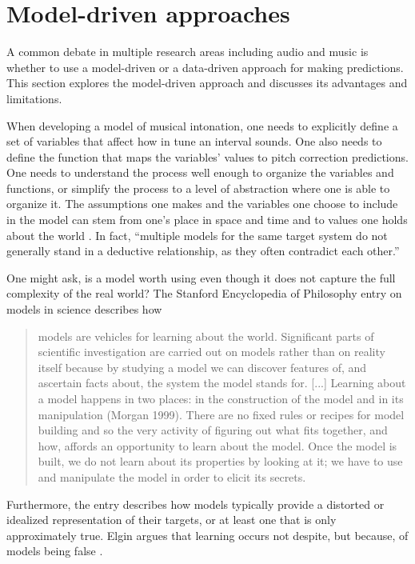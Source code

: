 \section{Model-driven approaches}
A common debate in multiple research areas including audio and music is whether to use a model-driven or a data-driven approach for making predictions. This section explores the model-driven approach and discusses its advantages and limitations. 

When developing a model of musical intonation, one needs to explicitly define a set of variables that affect how in tune an interval sounds. One also needs to define the function that maps the variables' values to pitch correction predictions. One needs to understand the process well enough to organize the variables and functions, or simplify the process to a level of abstraction where one is able to organize it. The assumptions one makes and the variables one choose to include in the model can stem from one's place in space and time and to values one holds about the world \cite{bacharach1989organizational}. In fact, ``multiple models for the same target system do not generally stand in a deductive relationship, as they often contradict each other.'' \cite{sep-models-science} 

One might ask, is a model worth using even though it does not capture the full complexity of the real world? The Stanford Encyclopedia of Philosophy entry on models in science describes how \begin{quote}models are vehicles for learning about the world. Significant parts of scientific investigation are carried out on models rather than on reality itself because by studying a model we can discover features of, and ascertain facts about, the system the model stands for. [...] Learning about a model happens in two places: in the construction of the model and in its manipulation (Morgan 1999). There are no fixed rules or recipes for model building and so the very activity of figuring out what fits together, and how, affords an opportunity to learn about the model. Once the model is built, we do not learn about its properties by looking at it; we have to use and manipulate the model in order to elicit its secrets. \cite{sep-models-science}\end{quote} Furthermore, the entry describes how models typically provide a distorted or idealized representation of their targets, or at least one that is only approximately true. Elgin argues that learning occurs not despite, but because, of models being false \cite{elgin2017true}. 

